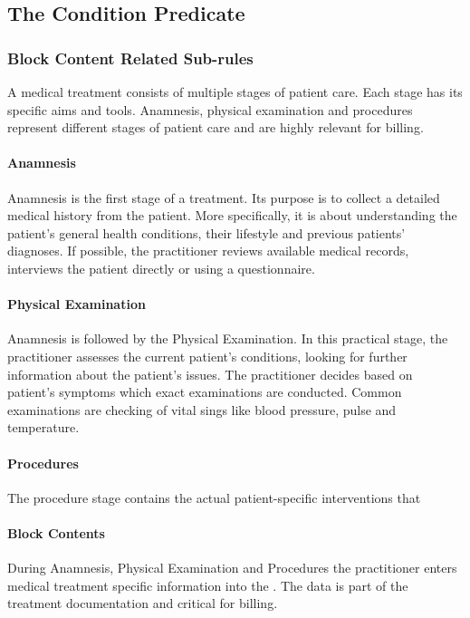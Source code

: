 \subsection{The Condition Predicate}\label{subsec:the-condition-predicate}

\subsubsection{Block Content Related Sub-rules}

A medical treatment consists of multiple stages of patient care.
Each stage has its specific aims and tools.
Anamnesis,
physical examination and procedures represent different stages of patient care and are highly relevant for billing.

\paragraph{Anamnesis}
Anamnesis is the first stage of a treatment.
Its purpose is to collect a detailed medical history from the patient\cite{lino2021medical}.
More specifically, it is about understanding the patient's general health conditions,
their lifestyle and previous patients' diagnoses.
If possible, the practitioner reviews available medical records,
interviews the patient directly or using a questionnaire\cite{zhang2011anamnevis}.

\paragraph{Physical Examination}
Anamnesis is followed by the Physical Examination.
In this practical stage, the practitioner assesses the current patient's conditions,
looking for further information about the patient's issues\cite{seidel2010mosby}.
The practitioner decides based on patient's symptoms which exact examinations are conducted.
Common examinations are checking of vital sings like blood pressure, pulse and temperature.

\paragraph{Procedures}
The procedure stage contains the actual patient-specific interventions that \todo

\paragraph{Block Contents}
During Anamnesis,
Physical Examination and Procedures the practitioner enters medical treatment specific information into the \AVS.
The data is part of the treatment documentation and critical for billing.

